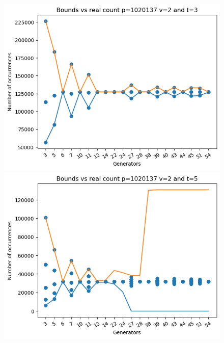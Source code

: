 \documentclass{article}
\begin{document}
\begin{figure}[H]
\begin{minipage}{.49\textwidth}
    \end{minipage}
    \begin{minipage}{.49\textwidth}
            \centering
            \includegraphics[width=\textwidth]{../plots/tuples_figures/1020137v2/test_p1020137_v2_t3.png}
            \includegraphics[width=\textwidth]{../plots/tuples_figures/1020137v2/test_p1020137_v2_t5.png}

\end{minipage}
\end{figure}
\end{document}
